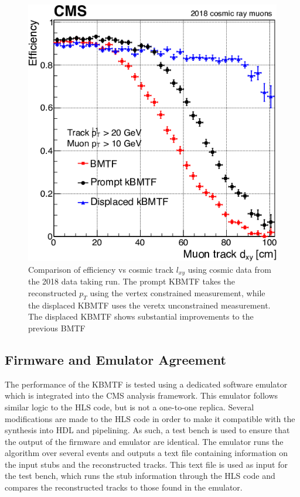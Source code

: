 \begin{figure}[htbp!]
	\centering
	\includegraphics[width=0.55\linewidth]{figs/04_muons/effVsDxy_kmtf.png}
	\caption[Comparison of efficiency vs cosmic track $l_{xy}$ using cosmic data from the 2018 data taking run. The prompt KBMTF takes the reconstructed $p_{T}$ using the vertex constrained measurement, while the displaced KBMTF uses the veretx unconstrained measurement. The displaced KBMTF shows substantial improvements to the previous BMTF~\cite{cmscollaboration2023development}]
	{Comparison of efficiency vs cosmic track $l_{xy}$ using cosmic data from the 2018 data taking run. The prompt KBMTF takes the reconstructed $p_{T}$ using the vertex constrained measurement, while the displaced KBMTF uses the veretx unconstrained measurement. The displaced KBMTF shows substantial improvements to the previous BMTF~\cite{cmscollaboration2023development}}
	\label{fig:effVsDxy_kmtf}
\end{figure}

\subsection{Firmware and Emulator Agreement} \label{sec:kmtf_fwVsEmu}

The performance of the KBMTF is tested using a dedicated software emulator which is integrated into the CMS analysis framework. This emulator follows similar logic to the HLS code, but is not a one-to-one replica. Several modifications are made to the HLS code in order to make it compatible with the synthesis into HDL and pipelining. As such, a test bench is used to ensure that the output of the firmware and emulator are identical. The emulator runs the algorithm over several events and outputs a text file containing information on the input stubs and the reconstructed tracks. This text file is used as input for the test bench, which  runs the stub information through the HLS code and compares the reconstructed tracks to those found in the emulator.

